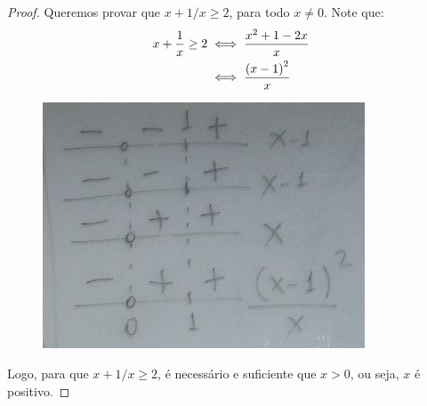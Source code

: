 \begin{proof}
Queremos provar que $x+1/x\ge 2$, para todo $x \ne 0$. Note que:
%
\begin{align*}
x+\dfrac{1}{x}\ge 2 &\iff \dfrac{x^2+1-2x}{x} \\
		&\iff \dfrac{\left(x-1\right)^2}{x}
\end{align*}

\begin{figure}[H]
\centering
\includegraphics{../../res/img/[ok]photo_2018-08-24_22-55-35(2).jpg}
\caption{}
\end{figure}

Logo, para que $x+1/x\ge 2$, é necessário e suficiente que $x > 0$, ou seja, $x$ é positivo.
\end{proof}